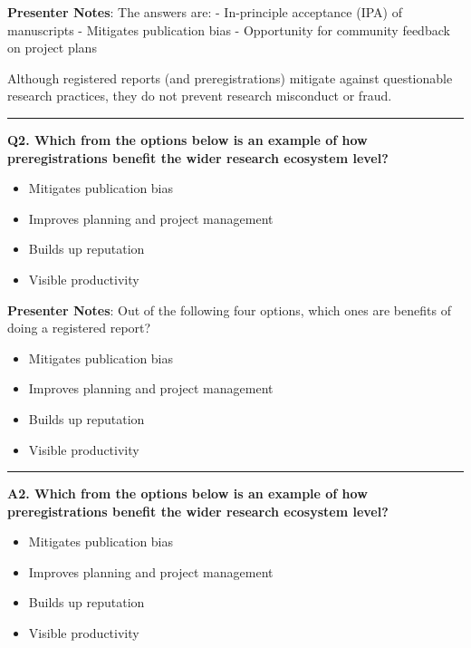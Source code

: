 \documentclass[
  letterpaper,
  DIV=11,
  numbers=noendperiod]{scrartcl}
\providecommand{\tightlist}{%
  \setlength{\itemsep}{0pt}\setlength{\parskip}{0pt}}
\begin{document}
\textbf{Presenter Notes}: The answers are: - In-principle acceptance
(IPA) of manuscripts - Mitigates publication bias - Opportunity for
community feedback on project plans

Although registered reports (and preregistrations) mitigate against
questionable research practices, they do not prevent research misconduct
or fraud.

\begin{center}\rule{0.5\linewidth}{0.5pt}\end{center}

\textbf{Q2. Which from the options below is an example of how
preregistrations benefit the wider research ecosystem level?}

\begin{itemize}
\tightlist
\item[$\square$]
  Mitigates publication bias
\item[$\square$]
  Improves planning and project management
\item[$\square$]
  Builds up reputation
\item[$\square$]
  Visible productivity
\end{itemize}

\textbf{Presenter Notes}: Out of the following four options, which ones
are benefits of doing a registered report?

\begin{itemize}
\tightlist
\item
  Mitigates publication bias
\item
  Improves planning and project management
\item
  Builds up reputation
\item
  Visible productivity
\end{itemize}

\begin{center}\rule{0.5\linewidth}{0.5pt}\end{center}

\textbf{A2. Which from the options below is an example of how
preregistrations benefit the wider research ecosystem level?}

\begin{itemize}
\tightlist
\item[$\boxtimes$]
  Mitigates publication bias
\item[$\square$]
  Improves planning and project management
\item[$\square$]
  Builds up reputation
\item[$\square$]
  Visible productivity
\end{itemize}
\end{document}
